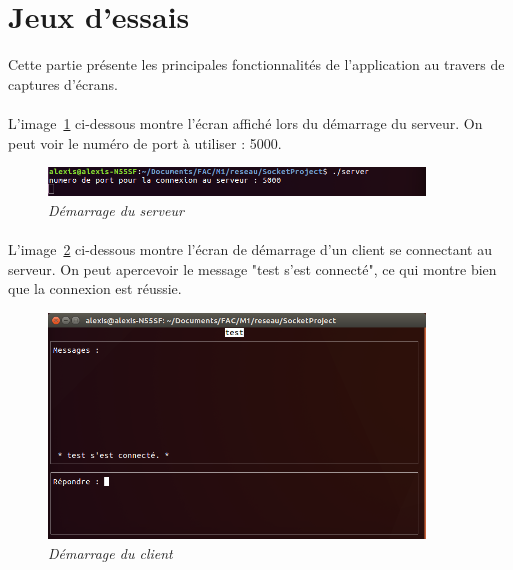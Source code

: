 \section{Jeux d'essais}

    Cette partie présente les principales fonctionnalités de l'application au travers de captures d'écrans.
    
    \paragraph{}
    L'image~\ref{fig:lancement_serveur} ci-dessous montre l'écran affiché lors du démarrage du serveur. On peut voir le numéro de port à utiliser : 5000.
    \begin{figure}[!htpb]
        \centering
        \includegraphics[width=10cm]{captures/lancement_serveur.png}
        \caption{\textit{Démarrage du serveur}}
        \label{fig:lancement_serveur}
    \end{figure}
    
    \FloatBarrier
    
    \paragraph{}
    L'image~\ref{fig:lancement_client} ci-dessous montre l'écran de démarrage d'un client se connectant au serveur. On peut apercevoir le message "test s'est connecté", ce qui montre bien que la connexion est réussie.
    \begin{figure}[!htpb]
        \centering
        \includegraphics[width=10cm]{captures/lancement_client.png}
        \caption{\textit{Démarrage du client}}
        \label{fig:lancement_client}
    \end{figure}
    
    \FloatBarrier
    
